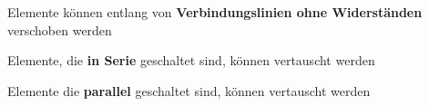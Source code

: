 										\fix
					\fix \fix
										\beginip
											Elemente können entlang von \textbf{Verbindungslinien ohne Widerständen} verschoben werden\\
											\begin{center}
												\fix \fix \fix
											\end{center}
										\iend
					\fix \fix
										\beginip
											Elemente, die \textbf{in Serie} geschaltet sind, können vertauscht werden
											\begin{center}
												\fix
											\end{center}
										\iend
					\fix \fix
										\beginip
											Elemente die \textbf{parallel} geschaltet sind, können vertauscht werden
											\begin{center}
												\fix
											\end{center}
